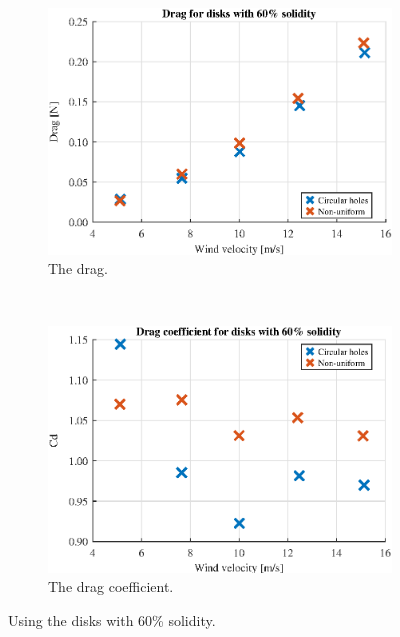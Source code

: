 \begin{figure} [h!]
    \centering
    \begin{subfigure}[b]{0.45\linewidth}
        \includegraphics[width=\textwidth]{0_Images/SixtyDrag.eps}
        \caption{The drag.}
        \label{Fig:SixtyDrag}
    \end{subfigure}
    ~
    \begin{subfigure}[b]{0.45\linewidth}
        \includegraphics[width=\textwidth]{0_Images/SixtyCD.eps}
        \caption{The drag coefficient.}
        \label{Fig:SixtyCD}
    \end{subfigure}
    \caption{Using the disks with 60\% solidity.}
    \label{fig:SixtyDisk}
\end{figure}

\FloatBarrier

